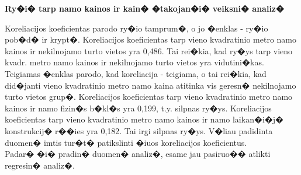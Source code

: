 \documentclass[a4paper]{article}
\begin{document}
\centerline{\textbf{\large Ry�i� tarp namo kainos ir kain� �takojan�i� veiksni� analiz�}}
\bigskip
\hspace*{1cm}Koreliacijos koeficientas parodo ry�io tamprum�, o jo �enklas - ry�io pob�d� ir krypt�. Koreliacijos koeficientas tarp vieno kvadratinio metro namo kainos ir nekilnojamo turto vietos yra 0,486. Tai rei�kia, kad ry�ys tarp vieno kvadr. metro namo kainos ir nekilnojamo turto vietos yra vidutini�kas. Teigiamas �enklas parodo, kad koreliacija - teigiama, o tai rei�kia, kad did�janti vieno kvadratinio metro namo kaina atitinka vis geresn� nekilnojamo turto vietos grup�. Koreliacijos koeficientas tarp vieno kvadratinio metro namo kainos ir namo fizin�s b�kl�s yra 0,199, t.y. silpnas ry�ys. Koreliacijos koeficientas tarp vieno kvadratinio metro namo kainos ir namo laikan�i�j� konstrukcij� r��ies yra 0,182. Tai irgi silpnas ry�ys. V�liau padidinta duomen� imtis tur�t� patikslinti �iuos koreliacijos koeficientus.\\
\hspace*{1cm}Padar� �i� pradin� duomen� analiz�, esame jau pasiruo�� atlikti regresin� analiz�.
\end{document}

